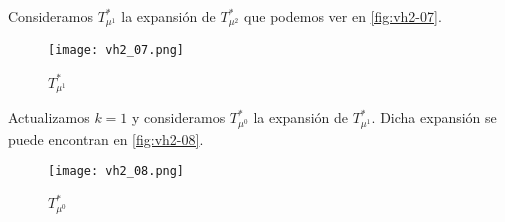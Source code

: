 \documentclass[12pt, oneside, a4paper]{article}
\begin{document}
Consideramos $T^{*}_{\mu^{1}}$ la expansión de $T^{*}_{\mu^{2}}$ que
podemos ver en \autoref{fig:vh2-07}.

\begin{figure}
\centering
\texttt{[image: vh2\_07.png]}
\caption{$T^{*}_{\mu^1}$}
\label{fig:vh2-07}
\end{figure}

Actualizamos $k=1$ y consideramos $T^{*}_{\mu^{0}}$ la expansión de
$T^{*}_{\mu^{1}}$. Dicha expansión se puede encontran en
\autoref{fig:vh2-08}.

\begin{figure}
\centering
\texttt{[image: vh2\_08.png]}
\caption{$T^{*}_{\mu^0}$}
\label{fig:vh2-08}
\end{figure}
\end{document}
